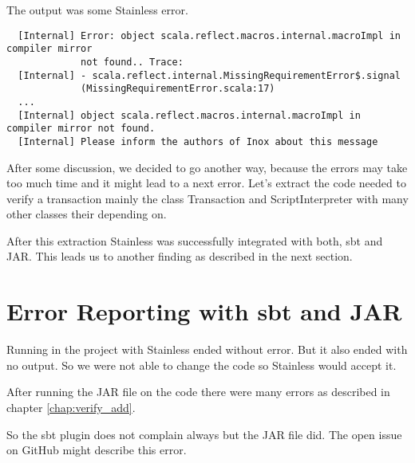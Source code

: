 The output was some Stainless error.
\begin{verbatim}
  [Internal] Error: object scala.reflect.macros.internal.macroImpl in compiler mirror
             not found.. Trace:
  [Internal] - scala.reflect.internal.MissingRequirementError$.signal
             (MissingRequirementError.scala:17)
  ...
  [Internal] object scala.reflect.macros.internal.macroImpl in compiler mirror not found.
  [Internal] Please inform the authors of Inox about this message
\end{verbatim}

After some discussion, we decided to go another way, because the errors may take too much time and it might lead to a next error.
Let's extract the code needed to verify a transaction mainly the class Transaction and ScriptInterpreter with many other classes their depending on.

After this extraction Stainless was successfully integrated with both, sbt and JAR.
This leads us to another finding as described in the next section.


\section{Error Reporting with sbt and JAR}

Running  in the project with Stainless ended without error.
But it also ended with no output.
So we were not able to change the code so Stainless would accept it.

After running the JAR file on the code there were many errors as described in chapter \ref{chap:verify_add}.

So the sbt plugin does not complain always but the JAR file did.
The open issue  on GitHub might describe this error.
